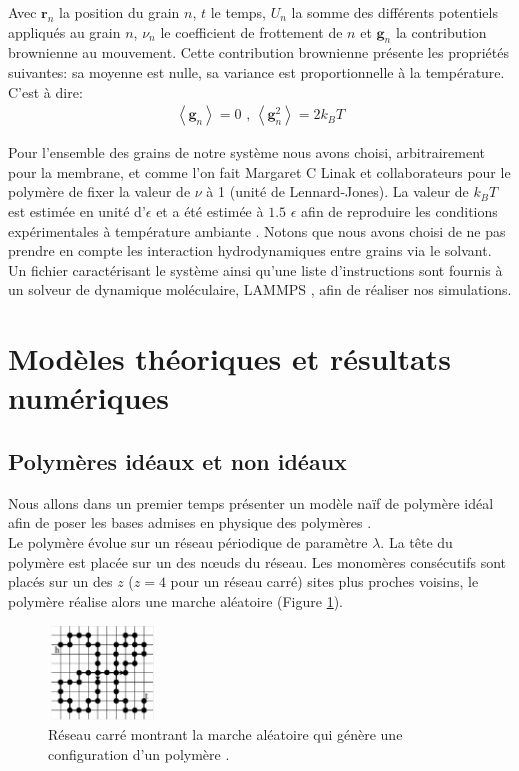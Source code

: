 \documentclass[a4paper,11pt]{article}
\begin{document}
Avec $\textbf{r}_n$ la position du grain $n$, $t$ le temps, $U_{n}$ la somme des différents potentiels appliqués au grain $n$, $\nu_n$ le coefficient de frottement de $n$ et $\textbf{g}_n$ la contribution brownienne au mouvement. Cette contribution brownienne présente les propriétés suivantes: sa moyenne est nulle, sa variance est proportionnelle à la température. C'est à dire:
\begin{eqnarray}
\left<\textbf{g}_n\right>\text{}=\text{} 0\text{ , } \left<\textbf{g}_n^2\right>\text{}=\text{} 2 k_B T
\end{eqnarray}

Pour l'ensemble des grains de notre système nous avons choisi, arbitrairement pour la membrane, et comme l'on fait Margaret C Linak et collaborateurs \cite{jchem} pour le polymère de fixer la valeur de $\nu$ à 1 (unité de Lennard-Jones). La valeur de $k_B T$ est estimée en unité d'$\epsilon$ et a été estimée à $1.5$ $\epsilon$ afin de reproduire les conditions expérimentales à température ambiante \cite{jchem}. Notons que nous avons choisi de ne pas prendre en compte les interaction hydrodynamiques entre grains via le solvant.\\

Un fichier caractérisant le système ainsi qu'une liste d'instructions sont fournis à un solveur de dynamique moléculaire, LAMMPS \cite{lammps}, afin de réaliser nos simulations.




\newpage
\section{Modèles théoriques et résultats numériques}

\subsection{Polymères idéaux et non idéaux}
Nous allons dans un premier temps présenter un modèle naïf de polymère idéal afin de poser les bases admises en physique des polymères \cite{sung,these}.\\

Le polymère évolue sur un réseau périodique de paramètre $\lambda$. La tête du polymère est placée sur un des nœuds du réseau. Les monomères consécutifs sont placés sur un des $z$ ($z=4$ pour un réseau carré) sites plus proches voisins, le polymère réalise alors une marche aléatoire (Figure \ref{resideal}).

\begin{figure}[H]
\begin{center}
\includegraphics[width=0.25\textwidth]{resideal.jpg}

\caption{Réseau carré montrant la marche aléatoire qui génère une configuration d'un polymère \cite{these}.}
\label{resideal}
\end{center}
\end{figure}
\end{document}
